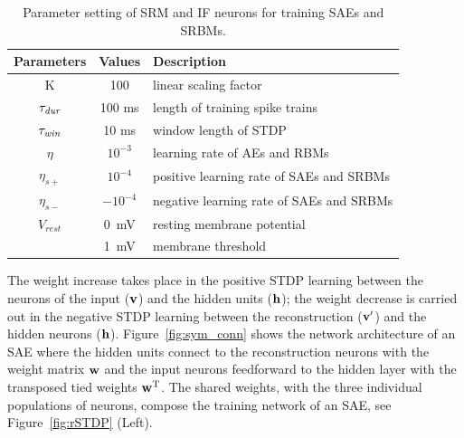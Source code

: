 \begin{table}[th]
	\centering
	\caption[Parameter setting of SRM.]{Parameter setting of SRM and IF neurons for training SAEs and SRBMs.}
	\bgroup
	\def\arraystretch{1.2}
	\begin{tabular}{c c l}
		Parameters & Values & Description \\
		\hline
		K & 100 & linear scaling factor\\
		$\tau_{\textit{\textrm{dur}}}$ & 100 ms &  length of training spike trains\\
		$\tau_{\textit{\textrm{win}}}$ & 10 ms & window length of STDP\\
		$\eta$ & $10^{-3}$ & learning rate of AEs and RBMs\\
		$\eta_{s+}$ & $10^{-4}$ & positive learning rate of SAEs and SRBMs\\
		$\eta_{s-}$ & $-10^{-4}$ & negative learning rate of SAEs and SRBMs\\
		$V_{rest}$ & 0~mV & resting membrane potential\\
		\DIFdelbeginFL \DIFdelFL{$V_{thresh}$ }\DIFdelendFL \DIFaddbeginFL \DIFaddFL{$V_{th}$ }\DIFaddendFL & 1~mV & membrane threshold  \\
	\end{tabular}
	\egroup
	\label{tbl:srm}
\end{table}

The weight increase takes place in the positive STDP learning between the neurons of the input ($\bf{v}$) and the hidden units ($\bf{h}$); 
the weight decrease is carried out in the negative STDP learning between the reconstruction ($\bf{v'}$) and the hidden neurons ($\bf{h}$).
Figure~\ref{fig:sym_conn} shows the network architecture of an SAE where the hidden units connect to the reconstruction neurons with the weight matrix $\bf{w}$ and the input neurons feedforward to the hidden layer with the transposed tied weights $\bf{w}^\textrm{T}$.
The shared weights, with the three individual populations of neurons, compose the training network of an SAE, see Figure~\ref{fig:rSTDP} (Left).

